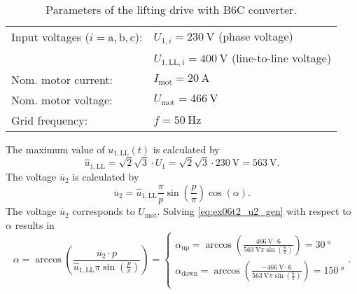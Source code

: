 \begin{table}[ht]
    \centering  %
    \begin{tabular}{ll}
        \toprule
        Input voltages ($i=\mathrm{a,b,c}$): & $U_{\mathrm{1},i}=\SI{230}{\volt}$ (phase voltage) \\
                        & $U_{\mathrm{1,LL},i} = \SI{400}{\volt}$ (line-to-line voltage)\\
        Nom. motor current: & $I_{\mathrm{mot}} = \SI{20}{\ampere}$ \\
        Nom. motor voltage: & $U_\mathrm{mot} = \SI{466}{\volt}$ \\ 
        Grid frequency: & $f= \SI{50}{\hertz}$ \\ 
        \bottomrule
    \end{tabular}
    \caption{Parameters of the lifting drive with B6C converter.}  
    \label{table:ex06_Task2_ParametersOfTheCircuit}
\end{table}


\begin{solutionblock}
    The maximum value of $u_\mathrm{1,LL}(t)$ is calculated by
    \begin{equation} 
        \hat{u}_\mathrm{1,LL}=\sqrt{2} \sqrt{3} \cdot U_\mathrm{1}= \sqrt{2} \sqrt{3} \cdot \SI{230}{\volt}=\SI{563}{\volt}.
        \label{eq:ex06t2_u1n_max}
    \end{equation}
    The voltage $\overline{u}_\mathrm{2}$ is calculated by
    \begin{equation} 
        \overline{u}_\mathrm{2} = \hat{u}_\mathrm{1,LL} \frac{\pi}{p}\sin(\frac{p}{\pi}) \cos(\alpha).
        \label{eq:ex06t2_u2_gen}
    \end{equation}
    The voltage $\overline{u}_\mathrm{2}$ corresponds to $U_\mathrm{mot}$. Solving \eqref{eq:ex06t2_u2_gen} with respect to $\alpha$ results in
    \begin{equation} 
        \alpha = \arccos( \frac{\overline{u}_\mathrm{2} \cdot p}{\hat{u}_\mathrm{1,LL}\pi \sin(\frac{p}{\pi})}) =
        \begin{cases}
            \alpha_\mathrm{up} = \arccos( \frac{\SI{466}{\volt} \cdot 6}{\SI{563}{\volt}\pi \sin(\frac{6}{\pi})})=\SI{30}{\degree}     \\
            \alpha_\mathrm{down} = \arccos( \frac{\SI{-466}{\volt} \cdot 6}{\SI{563}{\volt}\pi \sin(\frac{6}{\pi})})=\SI{150}{\degree}    \\
        \end{cases}.
        \label{eq:ex06t2_alpha_gen}
    \end{equation}
\end{solutionblock}

